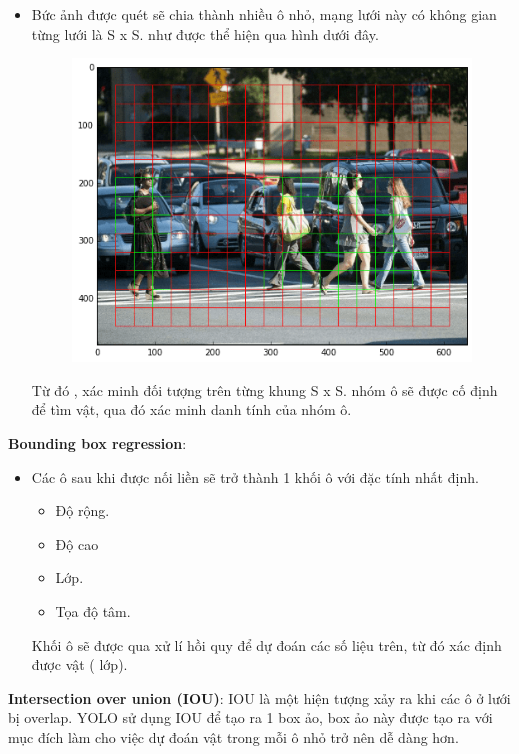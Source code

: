 \documentclass{article}
\begin{document}
	\begin{itemize}
		\item Bức ảnh được quét sẽ chia thành nhiều ô nhỏ, mạng lưới này có không gian từng lưới là S x S. như được thể hiện qua hình dưới đây.
		\begin{figure}[H]
			\centering
			\includegraphics[width=1\linewidth]{images/b2_1.png}
			\label{fig:writing-thesis}
		\end{figure}
		Từ đó , xác minh đối tượng trên từng khung S x S. nhóm ô sẽ được cố định để tìm vật, qua đó xác minh danh tính của nhóm ô.
	\end{itemize}
	\textbf{Bounding box regression}:
	\begin{itemize}
		\item Các ô sau khi được nối liền sẽ trở thành 1 khối ô với đặc tính nhất định.
		\begin{itemize}
			\item Độ rộng.
			\item Độ cao
			\item Lớp.
			\item Tọa độ tâm.
		\end{itemize}
		Khối ô sẽ được qua xử lí hồi quy để dự đoán các số liệu trên, từ đó xác định được vật ( lớp).
	\end{itemize}
	\textbf{Intersection over union (IOU)}:\newline
	IOU là một hiện tượng xảy ra khi các ô ở lưới bị overlap. YOLO sử dụng IOU để tạo ra 1 box ảo, box ảo này được tạo ra với mục đích làm cho việc dự đoán vật trong mỗi ô nhỏ trở nên dễ dàng hơn. 
\end{document}
